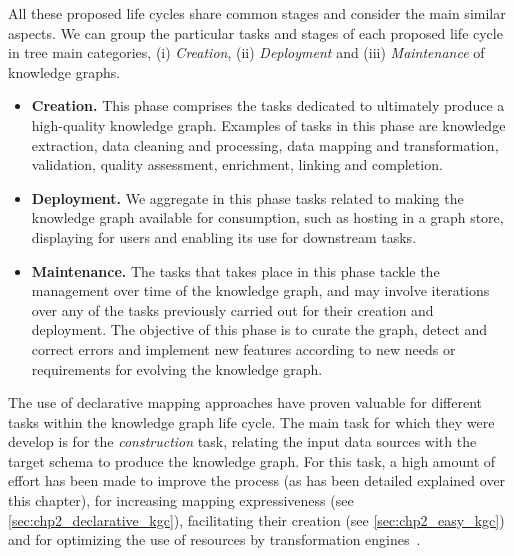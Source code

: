 All these proposed life cycles share common stages and consider the main similar aspects. We can group the particular tasks and stages of each proposed life cycle in tree main categories, (i) \textit{Creation}, (ii) \textit{Deployment} and (iii) \textit{Maintenance} of knowledge graphs. 
\begin{itemize}
    \item \textbf{Creation.} This phase comprises the tasks dedicated to ultimately produce a high-quality knowledge graph. Examples of tasks in this phase are knowledge extraction, data cleaning and processing, data mapping and transformation, validation, quality assessment, enrichment, linking and completion.

    \item \textbf{Deployment.} We aggregate in this phase tasks related to making the knowledge graph available for consumption, such as hosting in a graph store, displaying for users and enabling its use for downstream tasks. 

    \item \textbf{Maintenance.} The tasks that takes place in this phase tackle the management over time of the knowledge graph, and may involve iterations over any of the tasks previously carried out for their creation and deployment. The objective of this phase is to curate the graph, detect and correct errors and implement new features according to new needs or requirements for evolving the knowledge graph.
\end{itemize}

The use of declarative mapping approaches have proven valuable for different tasks within the knowledge graph life cycle. The main task for which they were develop is for the \textit{construction} task, relating the input data sources with the target schema to produce the knowledge graph. For this task, a high amount of effort has been made to improve the process (as has been detailed explained over this chapter), for increasing mapping expressiveness (see \cref{sec:chp2_declarative_kgc}), facilitating their creation (see \cref{sec:chp2_easy_kgc}) and for optimizing the use of resources by transformation engines~\parencite{arenas2022morphkgc,iglesias2023scaling,xiao2020virtual,iglesias2022empowering,jozashoori2019mapsdi}. 

